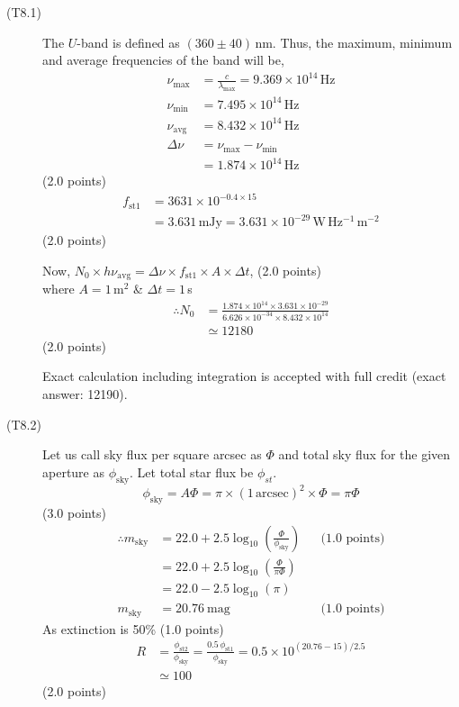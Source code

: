 \begin{description}
\item[(T8.1)]
The $U$-band is defined as $(360 \pm 40)$\,nm. Thus, the maximum, minimum and
average frequencies of the band will be,
\begin{align*}
\nu_{\mathrm{max}} &= \frac{c}{\lambda_{\mathrm{max}}}
  = 9.369 \times 10^{14}\,\mathrm{Hz} \\
\nu_{\mathrm{min}} &= 7.495 \times 10^{14}\,\mathrm{Hz} \\
\nu_{\mathrm{avg}} &= 8.432 \times 10^{14}\,\mathrm{Hz} \\
\Delta\nu &= \nu_{\mathrm{max}} - \nu_{\mathrm{min}} \\
  &= 1.874 \times 10^{14}\,\mathrm{Hz}
\end{align*}
\hfill(2.0 points)
\begin{align*}
f_{\mathrm{st1}} &= 3631 \times 10^{-0.4 \times 15} \\
  &= 3.631\,\mathrm{mJy}
   = 3.631 \times 10^{-29}\,\mathrm{W\,Hz^{-1}\,m^{-2}}
\end{align*}
\hfill(2.0 points)

Now, $N_0 \times h\nu_{\mathrm{avg}} = \Delta\nu \times f_{\mathrm{st1}}
\times A \times \Delta t$, \hfill(2.0 points)\\
where $A = 1\,\mathrm{m}^2$ \& $\Delta t = 1$\,s
\begin{align*}
\therefore N_0 &= \frac{1.874 \times 10^{14} \times 3.631 \times 10^{-29}}
  {6.626 \times 10^{-34} \times 8.432 \times 10^{14}} \\
  &\simeq 12180
\end{align*}
\hfill(2.0 points)

Exact calculation including integration is accepted with full credit (exact
answer: 12190).

\item[(T8.2)]
Let us call sky flux per square arcsec as $\Phi$ and total sky flux for the
given aperture as $\phi_{\mathrm{sky}}$. Let total star flux be
$\phi_{st}$.
\[ \phi_{\mathrm{sky}} = A\Phi = \pi \times (1\,\mathrm{arcsec})^2 \times \Phi
   = \pi\Phi \]
\hfill(3.0 points)
\begin{align*}
\therefore m_{\mathrm{sky}}
  &= 22.0 + 2.5\log_{10}\left(\frac{\Phi}{\phi_{\mathrm{sky}}}\right)
  && \text{(1.0 points)} \\
  &= 22.0 + 2.5\log_{10}\left(\frac{\Phi}{\pi\Phi}\right) \\
  &= 22.0 - 2.5\log_{10}(\pi) \\
m_{\mathrm{sky}} &= 20.76~\mathrm{mag}
  && \text{(1.0 points)}
\end{align*}
As extinction is 50\% \hfill(1.0 points)
\begin{align*}
R &= \frac{\phi_{\mathrm{st2}}}{\phi_{\mathrm{sky}}}
   = \frac{0.5\,\phi_{\mathrm{st1}}}{\phi_{\mathrm{sky}}}
   = 0.5 \times 10^{(20.76 - 15)/2.5} \\
  &\simeq 100
\end{align*}
\hfill(2.0 points)


\end{description}
